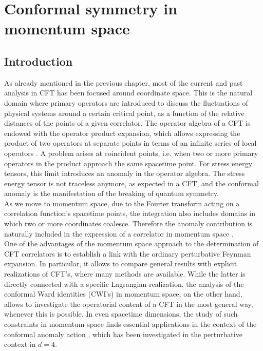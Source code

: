 \documentclass[a4paper,11pt,openright,twoside]{book}
\numberwithin{equation}{section}
\begin{document}
\chapter{Conformal symmetry in momentum space}

\section{Introduction}
As already mentioned in the previous chapter, most of the current and past analysis in 
CFT has been focused around coordinate space. This is the natural domain where primary operators are introduced to discuss the fluctuations of physical systems around a certain critical point, as a function of the relative distances of the points of a given correlator. The operator algebra of a CFT  is endowed with the operator product expansion, which allows expressing the product of two operators at separate points in terms of an infinite series of local operators \cite{ Ferrara:1973yt,Dolan:2000ut, Poland:2018epd, Poland:2016chs}. A problem arises at coincident points, i.e. when two or more primary operators in the product approach the same spacetime point. For stress energy tensors, this limit introduces an anomaly in the operator algebra. The stress energy tensor is not traceless anymore, as expected in a CFT, and the conformal anomaly is the manifestation of the breaking of quantum symmetry.\\
As we move to momentum space, due to the Fourier transform acting on a correlation function's spacetime points, the integration also includes domains in which two or more coordinates coalesce. Therefore the anomaly contribution is naturally included in the expression of a correlator in momentum space \cite{Capper:1975ig, Deser:1976yx, Riegert:1984kt, Coriano:2017mux}. \\
One of the advantages of the momentum space approach to the determination of CFT correlators is to establish a link with the ordinary perturbative Feynman expansion. In particular, it allows to compare general results with explicit realizations of CFT's, where many methods are available. While the latter is directly connected with a specific Lagrangian realization, the analysis of the conformal Ward identities (CWI's) in momentum space, on the other hand, allows to investigate the operatorial content of a CFT in the most general way, whenever this is possible.
In even spacetime dimensions, the study of such constraints in momentum space finds essential applications in the context of the conformal anomaly action \cite{Giannotti:2008cv,Armillis:2009pq, Armillis:2010qk}, which has been investigated in the perturbative context in $d=4$.  \\
\end{document}
